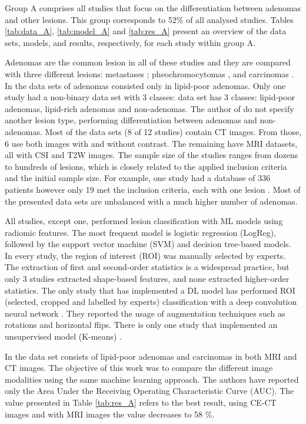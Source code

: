 \documentclass[11pt]{article}
\begin{document}
Group A comprises all studies that focus on the differentiation between adenomas
and other lesions. This group corresponds to 52\% of all analysed studies.
Tables \ref{tab:data_A}, \ref{tab:model_A} and \ref{tab:res_A} present an
overview of the data sets, models, and results, respectively, for each study
within group A.

Adenomas are the common lesion in all of these studies and they are compared
with three different lesions: metastases \cite{Schieda2017,Tu2018,Tu2020};
pheochromocytomas \cite{Yi20181,Yi2018, Liu2022,Liu2021}, and carcinomas
\cite{Elmohr2019, Torresan2021, Ho2019}. In \cite{Tu2020, Yi2018, Yi20181,
    Liu2022} the data sets of adenomas consisted only in lipid-poor adenomas. Only
one study had a non-binary data set with 3 classes: \cite{Romeo2018} data set
has 3 classes: lipid-poor adenomas, lipid-rich adenomas and non-adenomas. The
author of \cite{Kusunoki2022} do not specify another lesion type, performing
differentiation between adenomas and non-adenomas. Most of the data sets (8 of
12 studies) contain CT images. From those, 6 use both images with and without
contrast. The remaining have MRI datasets, all with CSI and T2W images. The
sample size of the studies ranges from dozens to hundreds of lesions, which is
closely related to the applied inclusion criteria and the initial sample size.
For example, one study had a database of 336 patients however only 19 met the
inclusion criteria, each with one lesion \cite{Torresan2021}. Most of the
presented data sets are unbalanced with a much higher number of adenomas.

All studies, except one, performed lesion classification
with ML models using radiomic features. The most frequent model is logistic
regression (LogReg), followed by the support vector machine (SVM) and decision
tree-based models. In every study, the region of interest (ROI) was manually
selected by experts. The extraction of first and second-order statistics is a
widespread practice, but only 3 studies extracted shape-based features, and none
extracted higher-order statistics. The only study that has implemented a DL
model has performed ROI (selected, cropped and labelled by experts)
classification with a deep convolution neural network \cite{Kusunoki2022}. They
reported the usage of augmentation techniques such as rotations and horizontal
flips. There is only one study that implemented an unsupervised model (K-means) \cite{Torresan2021}.

In \cite{Ho2019} the data set consists of lipid-poor adenomas and
carcinomas in both MRI and CT images. The objective of this work was to compare
the different image modalities using the same machine learning approach. The
authors have reported only the Area Under the Receiving Operating Characteristic
Curve (AUC). The value presented in Table \ref{tab:res_A} refers to the best result,
using CE-CT images and with MRI images the value decreases to 58 \%.
\end{document}
